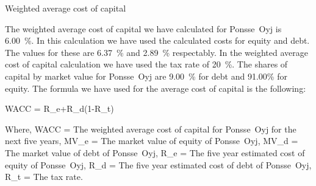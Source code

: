 Weighted average cost of capital

The weighted average cost of capital we have calculated for Ponsse~Oyj is 6.00~\%. In this calculation we have used the calculated costs for equity and debt. The values for these are 6.37~\% and 2.89~\% respectably. In the weighted average cost of capital calculation we have used the tax rate of 20~\%. The shares of capital by market value for Ponsse~Oyj are 9.00~\% for debt and 91.00\% for equity. The formula we have used for the average cost of capital is the following:

\textup{WACC} = \cdot R_{e}+\cdot R_{d}\cdot (1-R_{t})

Where,
WACC = The weighted average cost of capital for Ponsse~Oyj for the next five years,
MV_{e} = The market value of equity of Ponsse~Oyj,
MV_{d} = The market value of debt of Ponsse~Oyj,
R_{e} = The five year estimated cost of equity of Ponsse~Oyj,
R_{d} = The five year estimated cost of debt of Ponsse~Oyj,
R_{t} = The tax rate.
